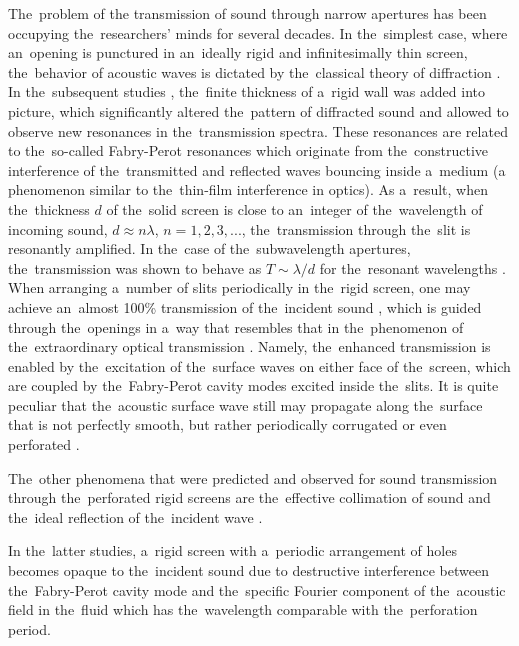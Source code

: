 The~problem of the transmission of sound through narrow apertures has been occupying the~researchers' minds for several decades.
In the~simplest case, where an~opening is punctured in an~ideally rigid and infinitesimally thin screen, the~behavior of acoustic waves is dictated by the~classical theory of diffraction \cite{spence,kinsler}.
In the~subsequent studies \cite{soroka,tinti}, the~finite thickness of a~rigid wall was added into picture, which significantly altered the~pattern of diffracted sound and allowed to observe new resonances in the~transmission spectra.
These resonances are related to the~so-called Fabry-Perot resonances which originate from the~constructive interference of the~transmitted and reflected waves bouncing inside a~medium (a phenomenon similar to the~thin-film interference in optics).
As a~result, when the~thickness $d$ of the~solid screen is close to an~integer of the~wavelength of incoming sound, $d \approx n\lambda$, $n=1,2,3,...$, the~transmission through the~slit is resonantly amplified.
In the~case of the~subwavelength apertures, the~transmission was shown to behave as $T\sim \lambda/d$ for the~resonant wavelengths \cite{christensen1}.
When arranging a~number of slits periodically in the~rigid screen, one may achieve an~almost 100\% transmission of the~incident sound \cite{lu}, which is guided through the~openings in a~way that resembles that in the~phenomenon of the~extraordinary optical transmission \cite{ebbesen}.
Namely, the~enhanced transmission is enabled by the~excitation of the~surface waves on either face of the~screen, which are coupled by the~Fabry-Perot cavity modes excited inside the~slits.
It is quite peculiar that the~acoustic surface wave still may propagate along the~surface that is not perfectly smooth, but rather periodically corrugated \cite{kelders} or even perforated \cite{christensen1,zhang999,hou}.

The~other phenomena that were predicted and observed for sound transmission through the~perforated rigid screens are the~effective collimation of sound \cite{christensen2,christensen3,zhou} and the~ideal reflection of the~incident wave \cite{norris4,estrada,estrada2,estrada3}.

In the~latter studies, a~rigid screen with a~periodic arrangement of holes becomes opaque to the~incident sound due to destructive interference between the~Fabry-Perot cavity mode and the~specific Fourier component of the~acoustic field in the~fluid which has the~wavelength comparable with the~perforation period. 

